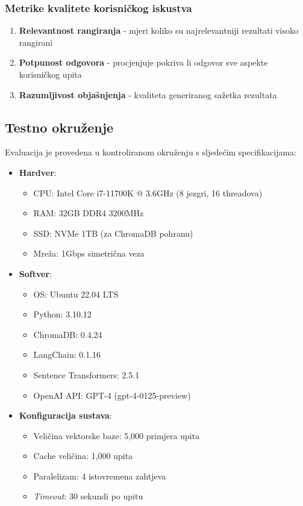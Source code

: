 \subsubsection{Metrike kvalitete korisničkog iskustva}

\begin{enumerate}
    \item \textbf{Relevantnost rangiranja} - mjeri koliko su najrelevantniji rezultati visoko rangirani
    \item \textbf{Potpunost odgovora} - procjenjuje pokriva li odgovor sve aspekte korisničkog upita
    \item \textbf{Razumljivost objašnjenja} - kvaliteta generiranog sažetka rezultata
\end{enumerate}

\subsection{Testno okruženje}

Evaluacija je provedena u kontroliranom okruženju s sljedećim specifikacijama:

\begin{itemize}
    \item \textbf{Hardver}:
    \begin{itemize}
        \item CPU: Intel Core i7-11700K @ 3.6GHz (8 jezgri, 16 threadova)
        \item RAM: 32GB DDR4 3200MHz
        \item SSD: NVMe 1TB (za ChromaDB pohranu)
        \item Mreža: 1Gbps simetrična veza
    \end{itemize}
    
    \item \textbf{Softver}:
    \begin{itemize}
        \item OS: Ubuntu 22.04 LTS
        \item Python: 3.10.12
        \item ChromaDB: 0.4.24
        \item LangChain: 0.1.16
        \item Sentence Transformers: 2.5.1
        \item OpenAI API: GPT-4 (gpt-4-0125-preview)
    \end{itemize}
    
    \item \textbf{Konfiguracija sustava}:
    \begin{itemize}
        \item Veličina vektorske baze: 5,000 primjera upita
        \item Cache veličina: 1,000 upita
        \item Paralelizam: 4 istovremena zahtjeva
        \item \textit{Timeout}: 30 sekundi po upitu
    \end{itemize}
\end{itemize}

